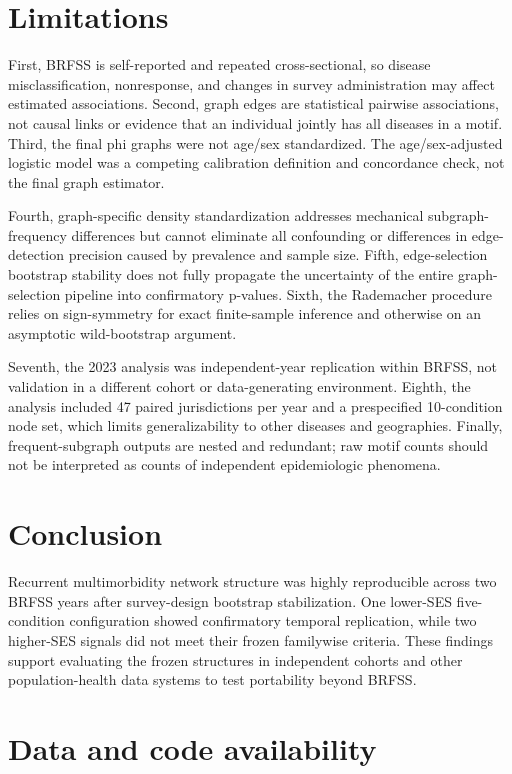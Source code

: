 \documentclass[11pt]{article}
\newcommand{\brfss}{\textsc{BRFSS}}
\begin{document}
\section{Limitations}

First, \brfss{} is self-reported and repeated cross-sectional, so disease
misclassification, nonresponse, and changes in survey administration may
affect estimated associations. Second, graph edges are statistical pairwise
associations, not causal links or evidence that an individual jointly has all
diseases in a motif. Third, the final phi graphs were not age/sex
standardized. The age/sex-adjusted logistic model was a competing calibration
definition and concordance check, not the final graph estimator.

Fourth, graph-specific density standardization addresses mechanical
subgraph-frequency differences but cannot eliminate all confounding or
differences in edge-detection precision caused by prevalence and sample size.
Fifth, edge-selection bootstrap stability does not fully propagate the
uncertainty of the entire graph-selection pipeline into confirmatory
p-values. Sixth, the Rademacher procedure relies on sign-symmetry for exact
finite-sample inference and otherwise on an asymptotic wild-bootstrap
argument.

Seventh, the 2023 analysis was independent-year replication within \brfss,
not validation in a different cohort or data-generating environment. Eighth,
the analysis included 47 paired jurisdictions per year and a prespecified
10-condition node set, which limits generalizability to other diseases and
geographies. Finally, frequent-subgraph outputs are nested and redundant;
raw motif counts should not be interpreted as counts of independent
epidemiologic phenomena.

\section{Conclusion}

Recurrent multimorbidity network structure was highly reproducible across
two \brfss{} years after survey-design bootstrap stabilization. One
lower-SES five-condition configuration showed confirmatory temporal
replication, while two higher-SES signals did not meet their frozen
familywise criteria. These findings support evaluating the frozen structures
in independent cohorts and other population-health data systems to test
portability beyond \brfss.

\section*{Data and code availability}
\end{document}
